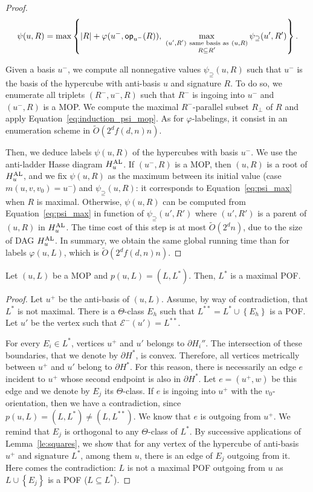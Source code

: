 \documentclass[a4paper,UKenglish,numberwithinsect,cleveref, autoref,anonymous]{lipics-v2021}
\newcommand{\set}[1]{\left\{ #1 \right\}}
\newcommand{\card}[1]{\left| #1 \right|}
\newcommand{\opp}{\mbox{\textsf{op}}}
\newcommand{\hual}{H_u^{\mbox{\scriptsize{AL}}}}
\newcommand{\psis}{\psi_{\supseteq}}
\begin{document}
\begin{proof}
\begin{equation}
    \psi(u,R) = \max \set{\card{R} + \varphi(u^-,\opp_{u^-}(R)),~ \max\limits_{\substack{(u',R') ~\mbox{\scriptsize{same basis as}}~ (u,R) \\ R \subseteq R'}} \psis(u',R')}.
    \label{eq:psi_max}
\end{equation}

Given a basis $u^-$, we compute all nonnegative values $\psis(u,R)$ such that $u^-$ is the basis of the hypercube with anti-basis $u$ and signature $R$. To do so, we enumerate all triplets $(R^-,u^-,R)$ such that $R^-$ is ingoing into $u^-$ and $(u^-,R)$ is a MOP. We compute the maximal $R^-$-parallel subset $R_{\perp}$ of $R$ and apply Equation~\eqref{eq:induction_psi_mop}. As for $\varphi$-labelings, it consist in an enumeration scheme in $\tilde{O}(2^df(d,n)n)$.

Then, we deduce labels $\psi(u,R)$ of the hypercubes with basis $u^-$. We use the anti-ladder Hasse diagram $\hual$. If $(u^-,R)$ is a MOP, then $(u,R)$ is a root of $\hual$, and we fix $\psi(u,R)$ as the maximum between its initial value (case $m(u,v,v_0) = u^-$) and $\psis(u,R)$: it corresponds to Equation~\eqref{eq:psi_max} when $R$ is maximal. Otherwise, $\psi(u,R)$ can be computed from Equation~\eqref{eq:psi_max} in function of $\psis(u',R')$ where $(u',R')$ is a parent of $(u,R)$ in $\hual$. The time cost of this step is at most $\tilde{O}(2^dn)$, due to the size of DAG $\hual$. In summary, we obtain the same global running time than for labels $\varphi(u,L)$, which is $\tilde{O}(2^df(d,n)n)$.
\end{proof}

\begin{lemma}
Let $(u,L)$ be a MOP and $p(u,L) = (L,L^*)$. Then, $L^*$ is a maximal POF.
\label{le:mop_max_subsets}
\end{lemma}
\begin{proof}
Let $u^+$ be the anti-basis of $(u,L)$. 
Assume, by way of contradiction, that $L^*$ is not maximal. There is a $\Theta$-class $E_h$ such that $L^{**} = L^* \cup \set{E_h}$ is a POF. Let $u'$ be the vertex such that $\mathcal{E}^-(u') = L^{**}$.

For every $E_i \in L^*$, vertices $u^+$ and $u'$ belongs to $\partial H_i''$. The intersection of these boundaries, that we denote by $\partial H^*$, is convex. Therefore, all vertices metrically between $u^+$ and $u'$ belong to $\partial H^*$. For this reason, there is necessarily an edge $e$ incident to $u^+$ whose second endpoint is also in $\partial H^*$. Let $e=(u^+,w)$ be this edge and we denote by $E_j$ its $\Theta$-class. If $e$ is ingoing into $u^+$ with the $v_0$-orientation, then we have a contradiction, since $p(u,L) = (L,L^*) \neq (L,L^{**})$. We know that $e$ is outgoing from $u^+$. We remind that $E_j$ is orthogonal to any $\Theta$-class of $L^*$. By successive applications of Lemma~\ref{le:squares}, we show that for any vertex of the hypercube of anti-basis $u^+$ and signature $L^*$, among them $u$, there is an edge of $E_j$ outgoing from it. Here comes the contradiction: $L$ is not a maximal POF outgoing from $u$ as $L \cup \set{E_j}$ is a POF ($L \subseteq L^*$).
\end{proof}
\end{document}
